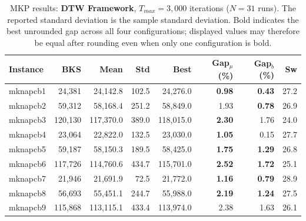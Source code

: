 \begin{table}[htbp]
\centering
\caption{MKP results: \textbf{DTW Framework}, $T_{max} = 3{,}000$ iterations
($N=31$ runs). The reported standard deviation is the sample standard
deviation. Bold indicates the best unrounded gap across all four
configurations; displayed values may therefore be equal after rounding even
when only one configuration is bold.}
\label{tab:mkp_dtw_3k}
\begin{tabular}{lrrrrrrr}
\toprule
\textbf{Instance} & \textbf{BKS} & \textbf{Mean} & \textbf{Std} & \textbf{Best} & \textbf{Gap$_\mu$ (\%)} & \textbf{Gap$_b$ (\%)} & \textbf{Sw} \\
\midrule
mknapcb1 & 24,381 & 24,142.8 & 102.5 & 24,276.0 & \textbf{0.98} & \textbf{0.43} & 27.2 \\
mknapcb2 & 59,312 & 58,168.4 & 251.2 & 58,849.0 & 1.93 & \textbf{0.78} & 26.9 \\
mknapcb3 & 120,130 & 117,370.0 & 389.0 & 118,015.0 & \textbf{2.30} & 1.76 & 24.0 \\
mknapcb4 & 23,064 & 22,822.0 & 132.5 & 23,030.0 & \textbf{1.05} & 0.15 & 27.7 \\
mknapcb5 & 59,187 & 58,150.3 & 189.5 & 58,425.0 & \textbf{1.75} & \textbf{1.29} & 26.8 \\
mknapcb6 & 117,726 & 114,760.6 & 434.7 & 115,701.0 & \textbf{2.52} & \textbf{1.72} & 25.1 \\
mknapcb7 & 21,946 & 21,691.9 & 72.5 & 21,772.0 & \textbf{1.16} & \textbf{0.79} & 28.9 \\
mknapcb8 & 56,693 & 55,451.1 & 244.7 & 55,988.0 & \textbf{2.19} & \textbf{1.24} & 27.5 \\
mknapcb9 & 115,868 & 113,115.1 & 433.4 & 113,974.0 & 2.38 & 1.63 & 26.1 \\
\bottomrule
\end{tabular}
\end{table}

